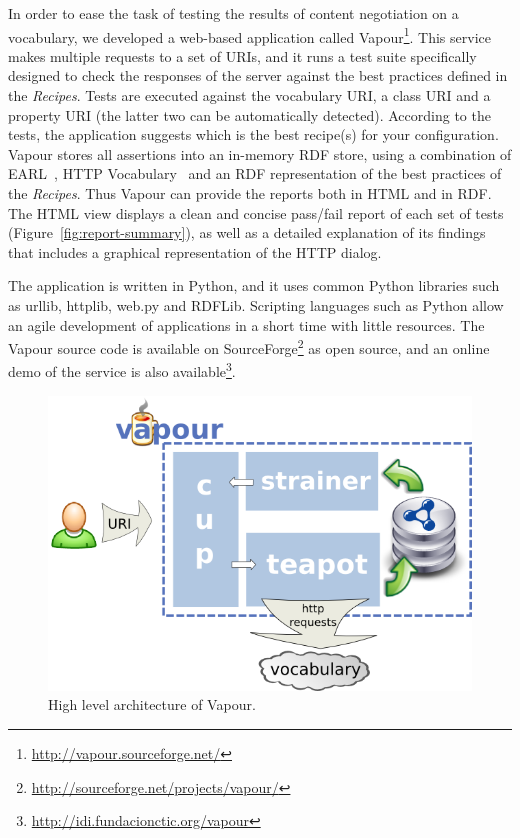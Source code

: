 \documentclass{../templates/llncs}
\begin{document}
In order to ease the task of testing the results of content negotiation on a vocabulary, we developed a web-based application called Vapour\footnote{\url{http://vapour.sourceforge.net/}}. This service makes multiple requests to a set of URIs, and it runs a test suite
specifically designed to check the responses 
of the server against the best practices defined in the \textit{Recipes}.
Tests are executed against the vocabulary
URI, a class URI and a property URI (the latter two can be automatically detected).
According to the tests, the application suggests which is the 
best recipe(s) for your configuration. Vapour stores all assertions into an in-memory RDF store, using a combination of EARL~\cite{EARL}, HTTP
Vocabulary~\cite{Koch2007} and an RDF representation of the best practices of the \textit{Recipes}. Thus Vapour 
can provide the reports both in HTML and in RDF. The HTML view
displays a clean and concise pass/fail report of each set of tests (Figure~\ref{fig:report-summary}),
as  well as a detailed explanation of its findings that
includes a graphical representation of the HTTP dialog.

The application is written in Python, and it uses common
Python libraries such as urllib, httplib, web.py and RDFLib. Scripting languages such 
as Python allow an agile development of applications in a short time with little 
resources. The Vapour source code is available on 
SourceForge\footnote{\url{http://sourceforge.net/projects/vapour/}} 
as open source, and an online demo of the service is also available\footnote{\url{http://idi.fundacionctic.org/vapour}}.

\begin{figure}
 \centering
 \includegraphics[width=12cm]{images/arch.png}
 \caption{\label{fig:arch}High level architecture of Vapour.}
\end{figure}
\end{document}
